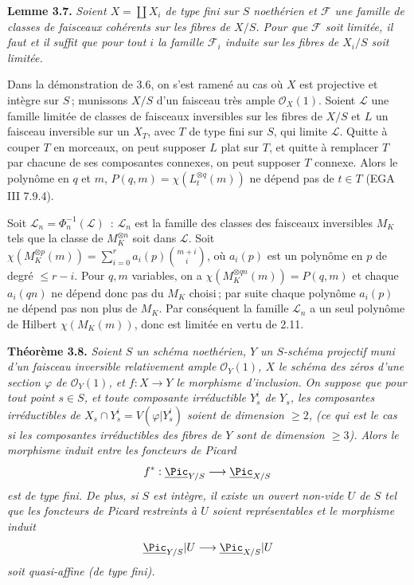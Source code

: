 \textbf{Lemme 3.7.} \emph{Soient \(X=\coprod X_i\) de type fini sur \(S\) noeth\'erien et \(\mathcal F\) une famille de classes de faisceaux coh\'erents sur les fibres de \(X/S\). Pour que \(\mathcal F\) soit limit\'ee, il faut et il suffit que pour tout \(i\) la famille \(\mathcal F_i\) induite sur les fibres de \(X_i/S\) soit limit\'ee.}

Dans la d\'emonstration de 3.6, on s'est ramen\'e au cas o\`u \(X\) est projective et int\`egre sur \(S\)\,; munissons \(X/S\) d'un faisceau tr\`es ample \(\mathcal O_X(1)\). Soient \(\mathcal L\) une famille limit\'ee de classes de faisceaux inversibles sur les fibres de \(X/S\) et \(L\) un faisceau inversible sur un \(X_T\), avec \(T\) de type fini sur \(S\), qui limite \(\mathcal L\). Quitte \`a couper \(T\) en morceaux, on peut supposer \(L\) plat sur \(T\), et quitte \`a remplacer \(T\) par chacune de ses composantes connexes, on peut supposer \(T\) connexe. Alors le polyn\^ome en \(q\) et \(m\), \(P(q,m)=\chi(L_t^{\otimes q}(m))\) ne d\'epend pas de \(t\in T\) (EGA III 7.9.4).

Soit \(\mathcal L_n=\Phi_n^{-1}(\mathcal L)\)~: \(\mathcal L_n\) est la famille des classes des faisceaux inversibles \(M_K\) tels que la classe de \(M_K^{\otimes n}\) soit dans \(\mathcal L\). Soit \(\chi(M_K^{\otimes p}(m))=\sum_{i=0}^{r}a_i(p)\binom{m+i}{i}\), o\`u \(a_i(p)\) est un polyn\^ome en \(p\) de degr\'e \(\le r-i\). Pour \(q,m\) variables, on a \(\chi(M_K^{\otimes qn}(m))=P(q,m)\) et chaque \(a_i(qn)\) ne d\'epend donc pas du \(M_K\) choisi\,; par suite chaque polyn\^ome \(a_i(p)\) ne d\'epend pas non plus de \(M_K\). Par cons\'equent la famille \(\mathcal L_n\) a un seul polyn\^ome de Hilbert \(\chi(M_K(m))\), donc est limit\'ee en vertu de 2.11.

\textbf{Th\'eor\`eme 3.8.} \emph{Soient \(S\) un sch\'ema noeth\'erien, \(Y\) un \(S\)-sch\'ema projectif muni d'un faisceau inversible relativement ample \(\mathcal O_Y(1)\), \(X\) le sch\'ema des z\'eros d'une section \(\varphi\) de \(\mathcal O_Y(1)\), et \(f:X\to Y\) le morphisme d'inclusion.}
\emph{On suppose que pour tout point \(s\in S\), et toute composante irr\'eductible \(Y_s^i\) de \(Y_s\), les composantes irr\'eductibles de \(X_s\cap Y_s^i=V(\varphi|Y_s^i)\) soient de dimension \(\ge2\), (ce qui est le cas si les composantes irr\'eductibles des fibres de \(Y\) sont de dimension \(\ge3\)). Alors le morphisme induit entre les foncteurs de Picard}
\[
f^*:\underline{\Pic}_{Y/S}\longrightarrow\underline{\Pic}_{X/S}
\]
\emph{est de type fini. De plus, si \(S\) est int\`egre, il existe un ouvert non-vide \(U\) de \(S\) tel que les foncteurs de Picard restreints \`a \(U\) soient repr\'esentables et le morphisme induit}
\[
\underline{\Pic}_{Y/S}|U\longrightarrow\underline{\Pic}_{X/S}|U
\]
\emph{soit quasi-affine (de type fini).}

